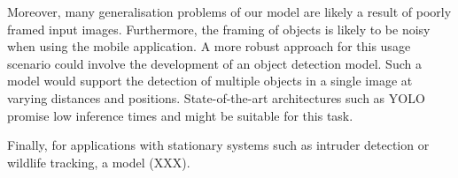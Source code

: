 \documentclass{l4proj}
\begin{document}
Moreover, many generalisation problems of our model are likely a result of poorly framed input images. Furthermore, the framing of objects is likely to be noisy when using the mobile application. A more robust approach for this usage scenario could involve the development of an object detection model. Such a model would support the detection of multiple objects in a single image at varying distances and positions. State-of-the-art architectures such as YOLO \citep{redmon_you_2016, redmon_yolov3_2018} promise low inference times and might be suitable for this task. 

Finally, for applications with stationary systems such as intruder detection or wildlife tracking, a model (XXX).

%
% 
\end{document}
